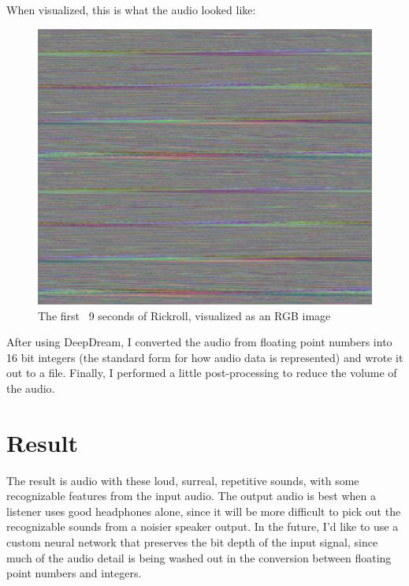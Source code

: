 \documentclass[11pt]{article}
\begin{document}
When visualized, this is what the audio looked like:
\begin{figure}[!htb]
    \includegraphics[width=\linewidth]{visualizations/rickroll/0.jpg}
    \caption{The first ~9 seconds of Rickroll, visualized as an RGB image}
    \label{fig:rickroll}
\end{figure}
\FloatBarrier
After using DeepDream, I converted the audio from floating point numbers into 16 bit integers (the standard form for how audio data is represented) and wrote it out to a file.
Finally, I performed a little post-processing to reduce the volume of the audio.

\section{Result}

The result is audio with these loud, surreal, repetitive sounds, with some recognizable features from the input audio. The output audio is best when a listener uses
good headphones alone, since it will be more difficult to pick out the recognizable sounds from a noisier speaker output. In the future, I'd like to use a custom neural network
that preserves the bit depth of the input signal, since much of the audio detail is being washed out in the conversion between floating point numbers and integers.
\end{document}
